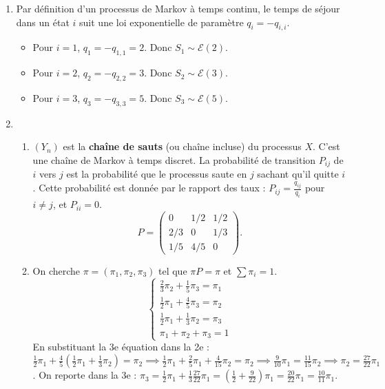 \documentclass[]{exercices}
\begin{document}
\begin{solution}
\begin{enumerate}
    \item Par définition d'un processus de Markov à temps continu, le temps de séjour dans un état $i$ suit une loi exponentielle de paramètre $q_i = -q_{i,i}$.
    \begin{itemize}
        \item Pour $i=1$, $q_1 = -q_{1,1} = 2$. Donc $S_1 \sim \mathcal{E}(2)$.
        \item Pour $i=2$, $q_2 = -q_{2,2} = 3$. Donc $S_2 \sim \mathcal{E}(3)$.
        \item Pour $i=3$, $q_3 = -q_{3,3} = 5$. Donc $S_3 \sim \mathcal{E}(5)$.
    \end{itemize}
    \item
    \begin{enumerate}
        \item $(Y_n)$ est la \textbf{chaîne de sauts} (ou chaîne incluse) du processus $X$. C'est une chaîne de Markov à temps discret. La probabilité de transition $P_{ij}$ de $i$ vers $j$ est la probabilité que le processus saute en $j$ sachant qu'il quitte $i$. Cette probabilité est donnée par le rapport des taux : $P_{ij} = \frac{q_{ij}}{q_i}$ pour $i \neq j$, et $P_{ii}=0$.
        \[ P = \begin{pmatrix}
        0 & 1/2 & 1/2 \\
        2/3 & 0 & 1/3 \\
        1/5 & 4/5 & 0
        \end{pmatrix}. \]
        \item On cherche $\pi = (\pi_1, \pi_2, \pi_3)$ tel que $\pi P = \pi$ et $\sum \pi_i = 1$.
        \[ \begin{cases} \frac{2}{3}\pi_2 + \frac{1}{5}\pi_3 = \pi_1 \\ \frac{1}{2}\pi_1 + \frac{4}{5}\pi_3 = \pi_2 \\ \frac{1}{2}\pi_1 + \frac{1}{3}\pi_2 = \pi_3 \\ \pi_1+\pi_2+\pi_3 = 1 \end{cases} \]
        En substituant la 3e équation dans la 2e : $\frac{1}{2}\pi_1 + \frac{4}{5}(\frac{1}{2}\pi_1 + \frac{1}{3}\pi_2) = \pi_2 \implies \frac{1}{2}\pi_1 + \frac{2}{5}\pi_1 + \frac{4}{15}\pi_2 = \pi_2 \implies \frac{9}{10}\pi_1 = \frac{11}{15}\pi_2 \implies \pi_2 = \frac{27}{22}\pi_1$.
        On reporte dans la 3e : $\pi_3 = \frac{1}{2}\pi_1 + \frac{1}{3}\frac{27}{22}\pi_1 = (\frac{1}{2}+\frac{9}{22})\pi_1 = \frac{20}{22}\pi_1 = \frac{10}{11}\pi_1$.

\end{enumerate}
\end{enumerate}
\end{solution}
\end{document}
